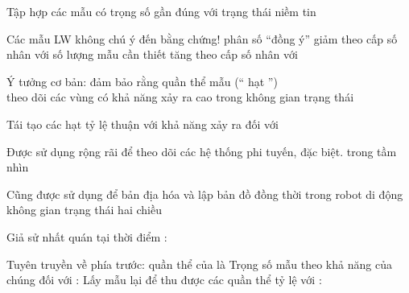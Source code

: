 \documentclass{article}
\begin{document}
\begin{huge}

Tập hợp các mẫu có trọng số gần đúng với trạng thái niềm tin

\vspace*{0.2in}

\textwidth
{}

Các mẫu LW không chú ý đến bằng chứng!\nl
   \mat{$\Rightarrow$} phân số ``đồng ý'' giảm theo cấp số nhân với \nl
   \mat{$\Rightarrow$} số lượng mẫu cần thiết tăng theo cấp số nhân với 

\vspace*{0.0in}

\textwidth
{}




Ý tưởng cơ bản: đảm bảo rằng quần thể mẫu (`` hạt '')\\
theo dõi các vùng có khả năng xảy ra cao trong không gian trạng thái

Tái tạo các hạt tỷ lệ thuận với khả năng xảy ra đối với 

\vspace*{0.2in}

\textwidth
{}

Được sử dụng rộng rãi để theo dõi các hệ thống phi tuyến, đặc biệt. trong tầm nhìn

Cũng được sử dụng để bản địa hóa và lập bản đồ đồng thời trong robot di động\al
  không gian trạng thái hai chiều



Giả sử nhất quán tại thời điểm : 

Tuyên truyền về phía trước: quần thể của  là
\mat{\[
  N(\x_{t+1}|\e_{1:t}) = \mysum_{\sx_t} P(\x_{t+1}|\x_t) N(\x_t|\e_{1:t})   
\]}
Trọng số mẫu theo khả năng của chúng đối với :
\mat{\[
  W(\x_{t+1}|\e_{1:t+1}) = P(\e_{t+1}|\x_{t+1}) N(\x_{t+1}|\e_{1:t}) 
\]}
Lấy mẫu lại để thu được các quần thể tỷ lệ với :



\end{huge}
\end{document}
